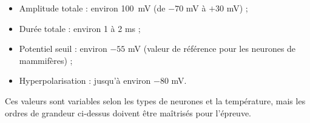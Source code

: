 \documentclass[11pt]{article}
\begin{document}
\begin{exemplebox}
\begin{itemize}
\item Amplitude totale : environ \SI{100}{mV} (de $-70$ mV à $+30$ mV) ;
\item Durée totale : environ 1 à 2 ms ;
\item Potentiel seuil : environ $-55$ mV (valeur de référence pour les neurones de mammifères) ;
\item Hyperpolarisation : jusqu'à environ $-80$ mV.
\end{itemize}
Ces valeurs sont variables selon les types de neurones et la température, mais les ordres de grandeur ci-dessus doivent être maîtrisés pour l'épreuve.
\end{exemplebox}
\end{document}
